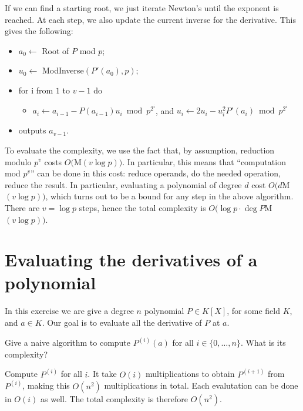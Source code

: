 \documentclass[11pt]{exam}
\theoremstyle{definition}
\begin{document}
{\begin{questions}
\begin{solution}
      If we can find a starting root, we just iterate Newton's until the exponent is reached. At each step, we also update the current inverse for the derivative. This gives the following:
      \begin{itemize}
      \item $a_0 \gets$ Root of $P$ mod $p$;
      \item $u_0 \gets$ ModInverse$(P'(a_0), p)$;
      \item for i from $1$ to $v-1$ do
        \begin{itemize}
        \item $a_i \gets a_{i-1}-P(a_{i-1})u_i\bmod p^{2^i}$, and $u_i\gets 2u_i-u_i^2P'(a_i)\bmod p^{2^i}$
        \end{itemize}
      \item outputs $a_{v-1}$.
      \end{itemize}
      To evaluate the complexity, we use the fact that, by assumption, reduction modulo $p^v$ costs $O(${\sc M}$(v\log p))$. In particular, this means that ``computation mod $p^v$'' can be done in this cost: reduce operands, do the needed operation, reduce the result. In particular, evaluating a polynomial of degree $d$ cost $O(d${\sc M}$(v\log p))$, which turns out to be a bound for any step in the above algorithm. There are $v=\log p$ steps, hence the total complexity is $O(\log p\cdot \deg P${\sc M}$(v\log p))$.

      
    \end{solution}
    
  \end{questions}

  \section{Evaluating the derivatives of a polynomial}

  In this exercise we are give a degree $n$ polynomial $P\in K[X]$, for some field $K$, and $a\in K$. Our goal is to evaluate all the derivative of $P$ at $a$.

  \begin{questions}
    \question Give a naive algorithm to compute $P^{(i)}(a)$ for all $i \in \{0,\dotsc,n\}$. What is its complexity?
    \begin{solution}
      Compute $P^{(i)}$ for all $i$. It take $O(i)$ multiplications to obtain $P^{(i+1)}$ from $P^{(i)}$, making this $O(n^2)$ multiplications in total. Each evalutation can be done in $O(i)$ as well. The total complexity is therefore $O(n^2)$.
    \end{solution}
    

\end{questions}}
\end{document}
